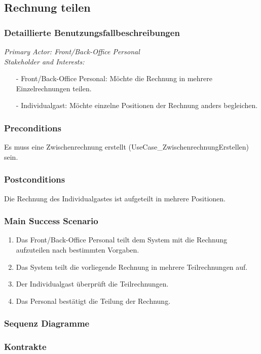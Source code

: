 \documentclass[./detailed_overview_usecases.tex]{subfiles}
\begin{document}
    \subsection{Rechnung teilen}
    \subsubsection{Detaillierte Benutzungsfallbeschreibungen}
    \textit{Primary Actor: Front/Back-Office Personal}
    \\
    \textit{Stakeholder and Interests:}
    \begin{itemize}
        \item[-] Front/Back-Office Personal: Möchte die Rechnung in mehrere Einzelrechnungen teilen.
        \item[-] Individualgast: Möchte einzelne Positionen der Rechnung anders begleichen.
    \end{itemize}

    \subsubsection*{Preconditions}
    Es muss eine Zwischenrechnung erstellt (UseCase_ZwischenrechnungErstellen) sein.

    \subsubsection*{Postconditions}
    Die Rechnung des Individualgastes ist aufgeteilt in mehrere Positionen.

    \subsubsection*{Main Success Scenario}
    \begin{enumerate}
        \item Das Front/Back-Office Personal teilt dem System mit die Rechnung aufzuteilen nach bestimmten Vorgaben.
        \item Das System teilt die vorliegende Rechnung in mehrere Teilrechnungen auf.
        \item Der Individualgast überprüft die Teilrechnungen.
        \item Das Personal bestätigt die Teilung der Rechnung.
    \end{enumerate}
    \subsubsection{Sequenz Diagramme}
    \subsubsection{Kontrakte}
\end{document}
